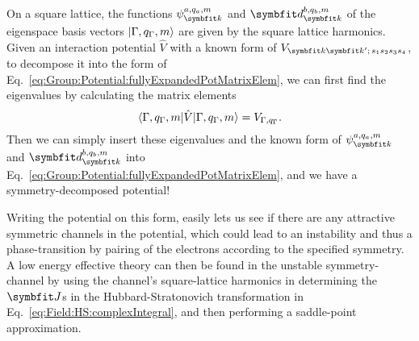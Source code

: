 On a square lattice, the functions $\psi_\v{k}^{a,q_a,m}$ and $\v{d}_\v{k}^{b,q_b,m}$ of the eigenspace basis vectors $\lvert \Gamma,q_\Gamma,m \rangle$ are given by
the square lattice harmonics. Given an interaction potential $\hat{V}$ with a known form of $V_{\v{k}\v{k}';\,s_1s_2s_3s_4}$, to decompose it into the form
of Eq.~\eqref{eq:Group:Potential:fullyExpandedPotMatrixElem}, we can first find the eigenvalues by calculating the matrix elements 
\begin{equation}
    \langle \Gamma, q_\Gamma,m \rvert\hat{V}\lvert \Gamma, q_\Gamma,m \rangle = V_{\Gamma,q_\Gamma}.
    \label{eq:Group:Potential:matrixElements}
\end{equation}
Then we can simply insert these eigenvalues and the known form of $\psi_\v{k}^{a,q_a,m}$
and $\v{d}_\v{k}^{b,q_b,m}$ into Eq.~\eqref{eq:Group:Potential:fullyExpandedPotMatrixElem}, and we have a symmetry-decomposed potential!

Writing the potential on this form, easily lets us see if there are any attractive symmetric channels in the potential, which could lead to an instability and thus a
phase-transition by pairing of the electrons according to the specified symmetry. A low energy effective theory can then be found in the unstable symmetry-channel
by using the channel's square-lattice harmonics in determining the $\v{J}$s in the Hubbard-Stratonovich transformation in Eq.~\eqref{eq:Field:HS:complexIntegral}, and then
performing a saddle-point approximation.
